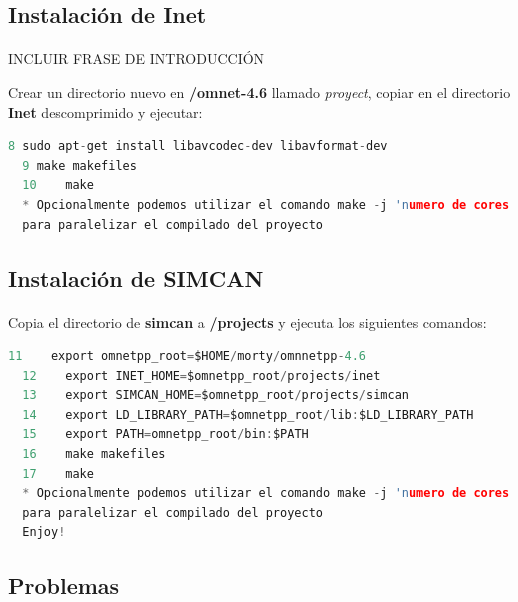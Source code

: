 \subsection{Instalación de Inet}
\paragraph{}

INCLUIR FRASE DE INTRODUCCIÓN

Crear un directorio nuevo en \textbf{/omnet-4.6} llamado \textit{proyect}, copiar en el directorio \textbf{Inet} descomprimido y ejecutar:

\begin{lstlisting}[language=c,frame=single,numbers=none]
  8	sudo apt-get install libavcodec-dev libavformat-dev
  9	make makefiles
  10	make
  * Opcionalmente podemos utilizar el comando make -j 'numero de cores'
  para paralelizar el compilado del proyecto
\end{lstlisting}

\subsection{Instalación de SIMCAN}
\paragraph{}

Copia el directorio de \textbf{simcan} a \textbf{/projects} y ejecuta los siguientes comandos:

\begin{lstlisting}[language=c,frame=single,numbers=none]
  11	export omnetpp_root=$HOME/morty/omnnetpp-4.6
  12	export INET_HOME=$omnetpp_root/projects/inet
  13	export SIMCAN_HOME=$omnetpp_root/projects/simcan
  14	export LD_LIBRARY_PATH=$omnetpp_root/lib:$LD_LIBRARY_PATH 
  15	export PATH=omnetpp_root/bin:$PATH
  16	make makefiles
  17	make
  * Opcionalmente podemos utilizar el comando make -j 'numero de cores'
  para paralelizar el compilado del proyecto
  Enjoy!
\end{lstlisting}

\subsection{Problemas}
\paragraph{}

